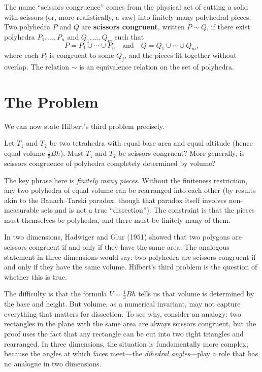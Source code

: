 \begin{remark}
The name ``scissors congruence'' comes from the physical act of cutting a solid with scissors (or, more realistically, a saw) into finitely many polyhedral pieces. Two polyhedra $P$ and $Q$ are \textbf{scissors congruent}, written $P \sim Q$, if there exist polyhedra $P_1, \ldots, P_n$ and $Q_1, \ldots, Q_m$ such that
\[
    P = P_1 \cup \cdots \cup P_n \quad \text{and} \quad Q = Q_1 \cup \cdots \cup Q_m,
\]
where each $P_i$ is congruent to some $Q_j$, and the pieces fit together without overlap. The relation $\sim$ is an equivalence relation on the set of polyhedra.
\end{remark}

\section{The Problem}

We can now state Hilbert's third problem precisely.

\begin{problem_statement}
Let $T_1$ and $T_2$ be two tetrahedra with equal base area and equal altitude (hence equal volume $\tfrac{1}{3}Bh$). Must $T_1$ and $T_2$ be scissors congruent? More generally, is scissors congruence of polyhedra completely determined by volume?
\end{problem_statement}

The key phrase here is \emph{finitely many pieces}. Without the finiteness restriction, any two polyhedra of equal volume can be rearranged into each other (by results akin to the Banach--Tarski paradox, though that paradox itself involves non-measurable sets and is not a true ``dissection''). The constraint is that the pieces must themselves be polyhedra, and there must be finitely many of them.

In two dimensions, Hadwiger and Glur (1951) showed that two polygons are scissors congruent if and only if they have the same area. The analogous statement in three dimensions would say: two polyhedra are scissors congruent if and only if they have the same volume. Hilbert's third problem is the question of whether this is true.

The difficulty is that the formula $V = \tfrac{1}{3}Bh$ tells us that volume is determined by the base and height. But volume, as a numerical invariant, may not capture everything that matters for dissection. To see why, consider an analogy: two rectangles in the plane with the same area are always scissors congruent, but the proof uses the fact that any rectangle can be cut into two right triangles and rearranged. In three dimensions, the situation is fundamentally more complex, because the angles at which faces meet---the \emph{dihedral angles}---play a role that has no analogue in two dimensions.

